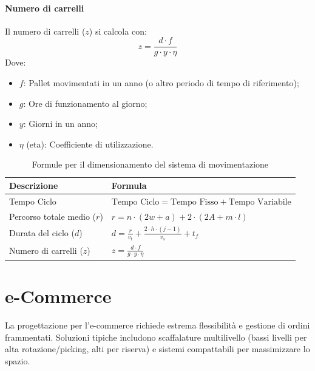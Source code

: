 \paragraph{Numero di carrelli}
Il numero di carrelli ($ z $) si calcola con:
\[
    z = \frac{d \cdot f}{g \cdot y \cdot \eta}
\]
Dove:
\begin{itemize}
    \item $ f $: Pallet movimentati in un anno (o altro periodo di tempo di riferimento);
    \item $ g $: Ore di funzionamento al giorno;
    \item $ y $: Giorni in un anno;
    \item $ \eta $ (eta): Coefficiente di utilizzazione.
\end{itemize}
\begin{table}
    \centering
    \renewcommand{\arraystretch}{2.0} %
    \begin{tabular}{ll} %
        \toprule
        \textbf{Descrizione}        & \textbf{Formula}                                                   \\
        \midrule
        Tempo Ciclo                 & $\text{Tempo Ciclo} = \text{Tempo Fisso} + \text{Tempo Variabile}$ \\
        Percorso totale medio ($r$) & $r = n \cdot (2w+a)+ 2 \cdot (2A+m \cdot l)$                       \\
        Durata del ciclo ($d$)      & $d = \frac{r}{v_{t}}+\frac{2 \cdot h \cdot (j-1)}{v_{s}} + t_{f}$  \\
        Numero di carrelli ($z$)    & $z = \frac{d \cdot f}{g \cdot y \cdot \eta}$                       \\
        \bottomrule
    \end{tabular}
    \caption{Formule per il dimensionamento del sistema di movimentazione}\label{tab:formule_carrelli}
\end{table}
%
\section{e-Commerce}
La progettazione per l'e-commerce richiede estrema flessibilità e gestione di ordini frammentati. Soluzioni tipiche includono scaffalature multilivello (bassi livelli per alta rotazione/picking, alti per riserva) e sistemi compattabili per massimizzare lo spazio.